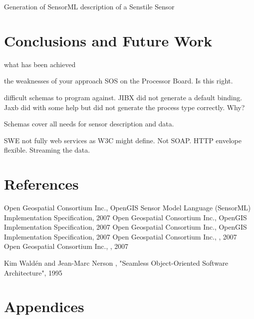 \documentclass[]{final_report}
\begin{document}
Generation of SensorML description of a Senstile Sensor

\chapter{ Conclusions and Future Work}

what has been achieved

the weaknesses of your approach
SOS on the Processor Board. Is this right.

difficult schemas to program against.
JIBX did not generate a default binding.
Jaxb did with some help but did not generate the process type correctly.
Why?

Schemas cover all needs for sensor description and data.

SWE not fully web services as W3C might define. Not SOAP. HTTP envelope
flexible.
Streaming the data.

\chapter{References}
\newpage
\begin{thebibliography}{99}
Open Geospatial Consortium Inc., OpenGIS Sensor Model Language (SensorML) Implementation Specification, 2007
Open Geospatial Consortium Inc., OpenGIS  Implementation Specification, 2007
Open Geospatial Consortium Inc., OpenGIS  Implementation Specification, 2007
Open Geospatial Consortium Inc., , 2007
Open Geospatial Consortium Inc., , 2007


Kim Waldén and Jean-Marc Nerson , "Seamless Object-Oriented Software Architecture", 1995
\end{thebibliography}
\label{endpage}


\chapter{Appendices}


\end{document}
